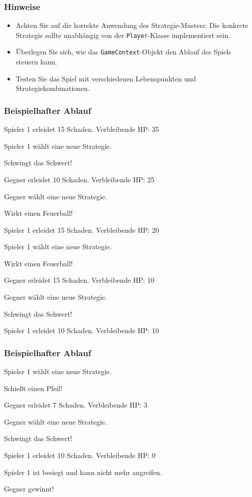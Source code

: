 \begin{frame}
    \frametitle{Hinweise}
    \begin{itemize}
        \item Achten Sie auf die korrekte Anwendung des Strategie-Musters: Die konkrete Strategie sollte unabhängig von der \texttt{Player}-Klasse implementiert sein.
        \item Überlegen Sie sich, wie das \texttt{GameContext}-Objekt den Ablauf des Spiels steuern kann.
        \item Testen Sie das Spiel mit verschiedenen Lebenspunkten und Strategiekombinationen.
    \end{itemize}
\end{frame}

\begin{frame}
    \frametitle{Beispielhafter Ablauf}
Spieler 1 erleidet 15 Schaden. Verbleibende HP: 35

Spieler 1 wählt eine neue Strategie.

Schwingt das Schwert!

Gegner erleidet 10 Schaden. Verbleibende HP: 25

Gegner wählt eine neue Strategie.

Wirkt einen Feuerball!

Spieler 1 erleidet 15 Schaden. Verbleibende HP: 20

Spieler 1 wählt eine neue Strategie.

Wirkt einen Feuerball!

Gegner erleidet 15 Schaden. Verbleibende HP: 10

Gegner wählt eine neue Strategie.

Schwingt das Schwert!

Spieler 1 erleidet 10 Schaden. Verbleibende HP: 10
\end{frame}

\begin{frame}
    \frametitle{Beispielhafter Ablauf}
Spieler 1 wählt eine neue Strategie.

Schießt einen Pfeil!

Gegner erleidet 7 Schaden. Verbleibende HP: 3

Gegner wählt eine neue Strategie.

Schwingt das Schwert!

Spieler 1 erleidet 10 Schaden. Verbleibende HP: 0

Spieler 1 ist besiegt und kann nicht mehr angreifen.

Gegner gewinnt!
\end{frame}
